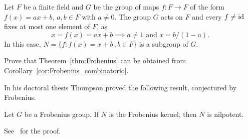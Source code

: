 \begin{example}
  Let $F$ be a finite field and $G$ be the group of maps 
  $f\colon F\to F$ of the form 
  $f(x)=ax+b$, $a,b\in F$ with $a\ne0$. The group $G$ acts on 
  $F$ and every 
  $f\ne\operatorname{id}$ fixes at most one element of $F$, as 
  \[
	x=f(x)=ax+b\implies a\ne 1\text{ and } x=b/(1-a).
  \]
  In this case, $N=\{f:f(x)=x+b\,,b\in F\}$ 
  is a subgroup of $G$.
\end{example}

\begin{exercise}
    Prove that Theorem~\ref{thm:Frobenius} can be obtained from
    Corollary~\ref{cor:Frobenius_combinatorio}.
\end{exercise}



In his doctoral thesis Thompson proved the following result, conjectured
by Frobenius. 

\begin{theorem}[Thompson]
    Let $G$ be a Frobenius group. If $N$ is the Frobenius kernel, then $N$ 
    is nilpotent.
\end{theorem}

See~\cite[Theorem 6.24]{MR2426855} for the proof.


